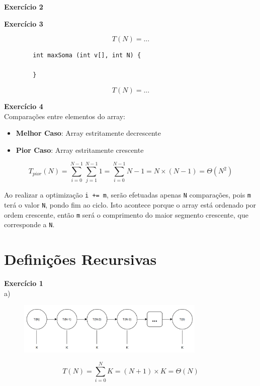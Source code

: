 \documentclass[a4paper,11pt]{article}
\begin{document}
	
	\noindent \textbf{Exercício 2}
	
	\noindent \textbf{Exercício 3}
	
	\[
	T(N) = ...
	\]
	
	\begin{verbatim}
		int maxSoma (int v[], int N) {
			
		}
	\end{verbatim}
	
	\[
	T(N) = ...
	\]
	
	
	\noindent \textbf{Exercício 4}\\
	
	\noindent Comparações entre elementos do array:
	
	\begin{itemize}
		\item \textbf{Melhor Caso}: Array estritamente decrescente
		\item \textbf{Pior Caso}: Array estritamente crescente
	\end{itemize}
	\[
		T_{pior}(N) = \sum_{i=0}^{N-1} \sum_{j=1}^{N-1} 1 = \sum_{i=0}^{N-1} N - 1 = N \times (N-1) = \Theta(N^2)
	\]
	
	\noindent Ao realizar a optimização \texttt{i += m}, serão efetuadas apenas \texttt{N} comparações, pois \texttt{m} terá o valor \texttt{N}, pondo fim ao ciclo. Isto acontece porque o array está ordenado por ordem crescente, então \texttt{m} será o comprimento do maior segmento crescente, que corresponde a \texttt{N}.
	
	
	\section{Definições Recursivas}
	
	\noindent \textbf{Exercício 1}\\
	
	\noindent a)
	
	\begin{figure}[h]
		\centering
		\includegraphics[width=0.8\textwidth]{imgs/2_1-a}
		\label{fig:2_1-a}
	\end{figure}
	\[
		T(N) = \sum_{i=0}^{N} K = (N + 1) \times K = \Theta(N)
	\]
	
\end{document}
